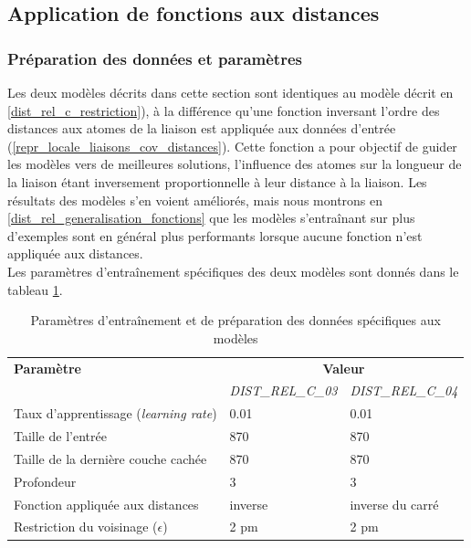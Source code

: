 \subsection{Application de fonctions aux distances}

\label{dist_rel_c_fun}

\subsubsection{Préparation des données et paramètres}
Les deux modèles décrits dans cette section sont identiques au modèle décrit en \ref{dist_rel_c_restriction}), à la différence qu'une fonction inversant l'ordre des distances aux atomes de la liaison est appliquée aux données d'entrée (\ref{repr_locale_liaisons_cov_distances}). Cette fonction a pour objectif de guider les modèles vers de meilleures solutions, l'influence des atomes sur la longueur de la liaison étant inversement proportionnelle à leur distance à la liaison. Les résultats des modèles s'en voient améliorés, mais nous montrons en \ref{dist_rel_generalisation_fonctions} que les modèles s'entraînant sur plus d'exemples sont en général plus performants lorsque aucune fonction n'est appliquée aux distances.\\
Les paramètres d'entraînement spécifiques des deux modèles sont donnés dans le tableau \ref{tparams_dist_rel_c_023}.

\begin{table}

	\centering
	\begin{tabular}{|l|l|l|}
		\hline
		\textbf{Paramètre} & \multicolumn{2}{|c|}{\textbf{Valeur}} \\ 
		 & \emph{DIST\_REL\_C\_03} & \emph{DIST\_REL\_C\_04} \\ \hline
		Taux d'apprentissage (\emph{learning rate}) & 0.01 & 0.01\\ \hline
		Taille de l'entrée & 870 & 870\\ \hline
		Taille de la dernière couche cachée & 870 & 870\\ \hline
		Profondeur & 3 & 3\\ \hline
		Fonction appliquée aux distances & inverse & inverse du carré\\ \hline
		Restriction du voisinage ($\epsilon$) & 2 pm & 2 pm\\ \hline
	\end{tabular}
	
	\caption{Paramètres d'entraînement et de préparation des données spécifiques aux modèles}
	\label{tparams_dist_rel_c_023}
\end{table}

